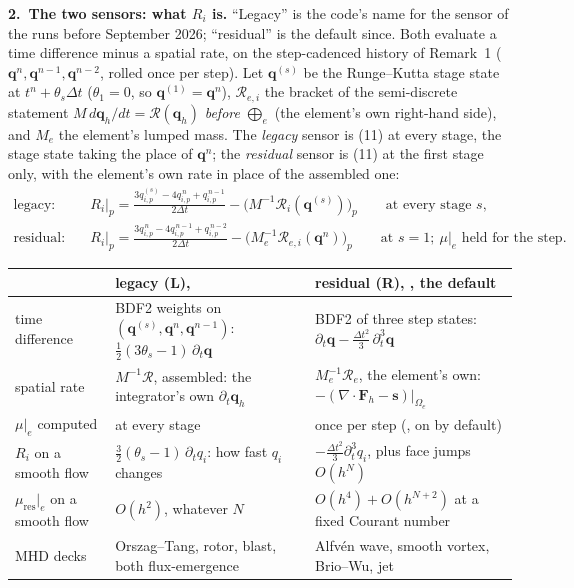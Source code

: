 \documentclass[10pt]{article}
\newcommand{\qq}{\bm{q}}
\newcommand{\FF}{\bm{F}}
\newcommand{\Rc}{\mathcal{R}}
\newcommand{\mres}{\mu_{\mathrm{res}}\big|_e}
\begin{document}
\textbf{2.\ The two sensors: what $R_i$ is.}
``Legacy'' is the code's name for the sensor of the runs before September 2026; ``residual'' is the default since. Both
evaluate a time difference minus a spatial rate, on the step-cadenced history of Remark~1 ($\qq^n,\qq^{n-1},\qq^{n-2}$, rolled
once per step). Let $\qq^{(s)}$ be the Runge--Kutta stage state at $t^n+\theta_s\Delta t$ ($\theta_1=0$, so $\qq^{(1)}=\qq^n$),
$\Rc_{e,i}$ the bracket of the semi-discrete statement $M\,d\qq_h/dt=\Rc(\qq_h)$ \emph{before} $\bigoplus_e$ (the element's
own right-hand side), and $M_e$ the element's lumped mass. The \emph{legacy} sensor is (11) at every stage, the stage state taking
the place of $\qq^n$; the \emph{residual} sensor is (11) at the first stage only, with the element's own rate in place of the
assembled one:
\begin{align}
\text{legacy:}\quad & R_i\big|_p=\frac{3q_{i,p}^{(s)}-4q_{i,p}^{\,n}+q_{i,p}^{\,n-1}}{2\Delta t}
  -\big(M^{-1}\Rc_i(\qq^{(s)})\big)_p\qquad\text{at every stage } s, \tag{L}\\[2pt]
\text{residual:}\quad & R_i\big|_p=\frac{3q_{i,p}^{\,n}-4q_{i,p}^{\,n-1}+q_{i,p}^{\,n-2}}{2\Delta t}
  -\big(M_e^{-1}\Rc_{e,i}(\qq^{n})\big)_p\qquad\text{at } s=1;\ \mu|_e \text{ held for the step.} \tag{R}
\end{align}

{\small\setlength{\tabcolsep}{4pt}\renewcommand{\arraystretch}{1.15}
\begin{tabularx}{\textwidth}{@{}l Y Y@{}}
\toprule
 & \textbf{legacy (L)},  & \textbf{residual (R)}, , the default\\
\midrule
time difference & BDF2 weights on $(\qq^{(s)},\qq^n,\qq^{n-1})$: $\tfrac12(3\theta_s-1)\,\partial_t\qq$
  & BDF2 of three step states: $\partial_t\qq-\tfrac{\Delta t^2}{3}\,\partial_t^3\qq$\\
spatial rate & $M^{-1}\Rc$, assembled: the integrator's own $\partial_t\qq_h$
  & $M_e^{-1}\Rc_e$, the element's own: $-(\nabla\cdot\FF_h-\bm{s})|_{\Omega_e}$\\
$\mu|_e$ computed & at every stage & once per step (, on by default)\\
$R_i$ on a smooth flow & $\tfrac32(\theta_s-1)\,\partial_tq_i$: how fast $q_i$ changes
  & $-\tfrac{\Delta t^2}{3}\partial_t^3q_i$, plus face jumps $O(h^N)$\\
$\mres$ on a smooth flow & $O(h^2)$, whatever $N$ & $O(h^4)+O(h^{N+2})$ at a fixed Courant number\\
MHD decks & Orszag--Tang, rotor, blast, both flux-emergence & Alfv\'en wave, smooth vortex, Brio--Wu, jet\\
\bottomrule
\end{tabularx}}
\end{document}

